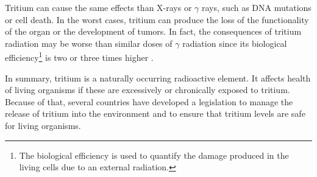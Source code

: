 Tritium can cause the same effects than X-rays or $\gamma$ rays, such as DNA mutations or cell death. In the worst cases, tritium can produce the loss of the functionality of the organ or the development of tumors. In fact, the consequences of tritium radiation may be worse than similar doses of $\gamma$ radiation since its biological efficiency\footnote{The biological efficiency is used to quantify the damage produced in the living cells due to an external radiation.} is two or three times higher \cite{StraumeTritiumHazard}.


In summary, tritium is a naturally occurring radioactive element. It affects health of living organisms if these are excessively or chronically exposed to tritium. Because of that, several countries have developed a legislation to manage the release of tritium into the environment and to ensure that tritium levels are safe for living organisms.




